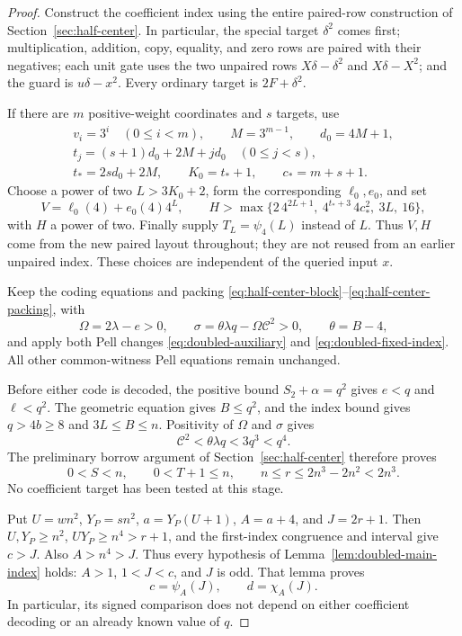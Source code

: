 \begin{proof}
Construct the coefficient index using the entire paired-row
construction of Section~\ref{sec:half-center}. In particular, the
special target $\delta^2$ comes first; multiplication, addition,
copy, equality, and zero rows are paired with their negatives; each
unit gate uses the two unpaired rows
$X\delta-\delta^2$ and $X\delta-X^2$; and the guard is
$u\delta-x^2$. Every ordinary target is $2F+\delta^2$.

If there are $m$ positive-weight coordinates and $s$ targets, use
\[
\begin{gathered}
 v_i=3^i\quad(0\le i<m),\qquad M=3^{m-1},\qquad d_0=4M+1,\\
 t_j=(s+1)d_0+2M+jd_0\quad(0\le j<s),\\
 t_*=2sd_0+2M,\qquad K_0=t_*+1,\qquad c_*=m+s+1.
\end{gathered}
\]
Choose a power of two $L>3K_0+2$, form the corresponding
$\ell_0,e_0$, and set
\[
 V=\ell_0(4)+e_0(4)4^L,\qquad
 H>\max\{2\,4^{2L+1},\ 4^{t_*+3}\,4c_*^2,\ 3L,\ 16\},
\]
with $H$ a power of two. Finally supply $T_L=\psi_4(L)$ instead
of $L$. Thus $V,H$ come from the new paired layout throughout;
they are not reused from an earlier unpaired index. These choices
are independent of the queried input $x$.

Keep the coding equations and packing
\eqref{eq:half-center-block}--\eqref{eq:half-center-packing}, with
\[
 \Omega=2\lambda-e>0,\qquad
 \sigma=\theta\lambda q-\Omega\mathcal C^2>0,
 \qquad \theta=B-4,
\]
and apply both Pell changes
\eqref{eq:doubled-auxiliary} and \eqref{eq:doubled-fixed-index}.
All other common-witness Pell equations remain unchanged.

Before either code is decoded, the positive bound $S_2+\alpha=q^2$
gives $e<q$ and $\ell<q^2$. The geometric equation gives
$B\le q^2$, and the index bound gives $q>4b\ge8$ and
$3L\le B\le n$. Positivity of $\Omega$ and $\sigma$ gives
\[
 \mathcal C^2<\theta\lambda q<3q^3<q^4.
\]
The preliminary borrow argument of Section~\ref{sec:half-center}
therefore proves
\begin{equation}\label{eq:composed99-preliminary}
 0<S<n,\qquad 0<T+1\le n,\qquad
 n\le r\le2n^3-2n^2<2n^3.
\end{equation}
No coefficient target has been tested at this stage.

Put $U=wn^2$, $Y_P=sn^2$, $a=Y_P(U+1)$, $A=a+4$, and $J=2r+1$.
Then $U,Y_P\ge n^2$, $UY_P\ge n^4>r+1$, and the first-index
congruence and interval give $c>J$. Also $A>n^4>J$.
Thus every hypothesis of Lemma~\ref{lem:doubled-main-index} holds:
$A>1$, $1<J<c$, and $J$ is odd. That lemma proves
\[
 c=\psi_A(J),\qquad d=\chi_A(J).
\]
In particular, its signed comparison does not depend on either
coefficient decoding or an already known value of $q$.


\end{proof}
